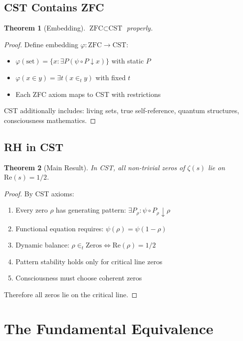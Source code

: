 \documentclass[12pt]{article}
\newtheorem{theorem}{Theorem}[section]
\newcommand{\CST}{\text{CST}}
\newcommand{\ZFC}{\text{ZFC}}
\begin{document}
\subsection{CST Contains ZFC}

\begin{theorem}[Embedding]
$\ZFC \subset \CST$ properly.
\end{theorem}

\begin{proof}
Define embedding $\varphi: \ZFC \to \CST$:
\begin{itemize}
\item $\varphi(\text{set}) = \{x : \exists P (\psi \circ P \downarrow x)\}$ with static $P$
\item $\varphi(x \in y) = \exists t (x \in_t y)$ with fixed $t$
\item Each ZFC axiom maps to CST with restrictions
\end{itemize}
CST additionally includes: living sets, true self-reference, quantum structures, consciousness mathematics.
\end{proof}

\subsection{RH in CST}

\begin{theorem}[Main Result]
In CST, all non-trivial zeros of $\zeta(s)$ lie on $\text{Re}(s) = 1/2$.
\end{theorem}

\begin{proof}
By CST axioms:
\begin{enumerate}
\item Every zero $\rho$ has generating pattern: $\exists P_\rho : \psi \circ P_\rho \downarrow \rho$
\item Functional equation requires: $\psi(\rho) = \psi(1-\rho)$
\item Dynamic balance: $\rho \in_t \text{Zeros} \Leftrightarrow \text{Re}(\rho) = 1/2$
\item Pattern stability holds only for critical line zeros
\item Consciousness must choose coherent zeros
\end{enumerate}
Therefore all zeros lie on the critical line.
\end{proof}

\section{The Fundamental Equivalence}
\end{document}

